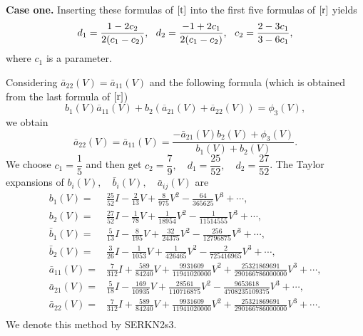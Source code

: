 \documentclass{article}
\begin{document}
\textbf{Case one.} Inserting these formulas of $\eqref{t}$ into the
first five formulas of $\eqref{r}$ yields
\begin{equation*}
\begin{array}
[c]{ll} d_{1}=\dfrac{1-2c_{2}}{2(c_{1}-c_{2})},\ \
 d_{2}=\dfrac{-1+2c_{1}}{2(c_{1}-c_{2})},\ \
 c_{2}=\dfrac{2-3c_{1}}{3-6c_{1}},
\end{array}
\label{x}%
\end{equation*}
where  $c_{1}$ is a parameter.

 Considering
$\bar{a}_{22}(V)=\bar{a}_{11}(V)$ and the following formula (which
is obtained from the last formula of
 $\eqref{r}$)
$$b_{1}(V)\overline{a}_{11}(V)+b_{2}(\overline{a}_{21}(V)+\overline{a}_{22}(V))=\phi_{3}(V),$$
we obtain
$$\bar{a}_{22}(V)=\bar{a}_{11}(V)=\dfrac{-\bar{a}_{21}(V)b_{2}(V)+\phi_{3}(V)}{b_{1}(V)+b_{2}(V)}.$$
We choose $c_{1}=\dfrac{1}{5}$ and then get $c_2=\dfrac{7}{9},$\ \
 $d_1=\dfrac{25}{52},$\ \ $d_2=\dfrac{27}{52}$. The Taylor expansions
of $b_{i}(V),$\ \ $\bar{b}_{i}(V),$\ \ $\bar{a}_{ij}(V)$ are
\begin{equation}
\begin{aligned}
b_1(V)=&\frac{25}{52}I -\frac{2}{13} V + \frac{8}{975} V^2 -
\frac{64}{365625} V^3 +  \cdots,
\\
b_2(V)=&\frac{27}{52}I -\frac{1}{78} V + \frac{1}{18954} V^2
-\frac{1}{11514555}V^{3} +\cdots,
\\
 \bar{b}_1(V)=&
 \frac{5}{13}I  -\frac{8}{195}
  V + \frac{32}{24375} V^2 - \frac{256}{12796875} V^3 +\cdots
,\\
\bar{b}_2(V)=&
 \frac{3}{26}I -\frac{1}{1053}
  V +  \frac{1}{426465} V^2  - \frac{2}{725416965} V^3 +\cdots
,\\
\bar{a}_{11}(V)=&
 \frac{7}{312}I +\frac{589}{84240}V +
 \frac{9931609}{11941020000}V^2+
 \frac{25321869691}{290166786000000}V^3 +\cdots
,\\
\bar{a}_{21}(V)=& \frac{5}{18}I -\frac{169}{10935}V +
\frac{28561}{110716875}V^2 -\frac{9653618}{4708235109375}V^3  +
\cdots
,\\
\bar{a}_{22}(V)=&
  \frac{7}{312}I +\frac{589}{84240}V
+ \frac{9931609}{11941020000}V^2 +
\frac{25321869691}{290166786000000}V^3 + \cdots
.\\
\end{aligned}
\end{equation}
We denote this method by SERKN2s3.
\end{document}
